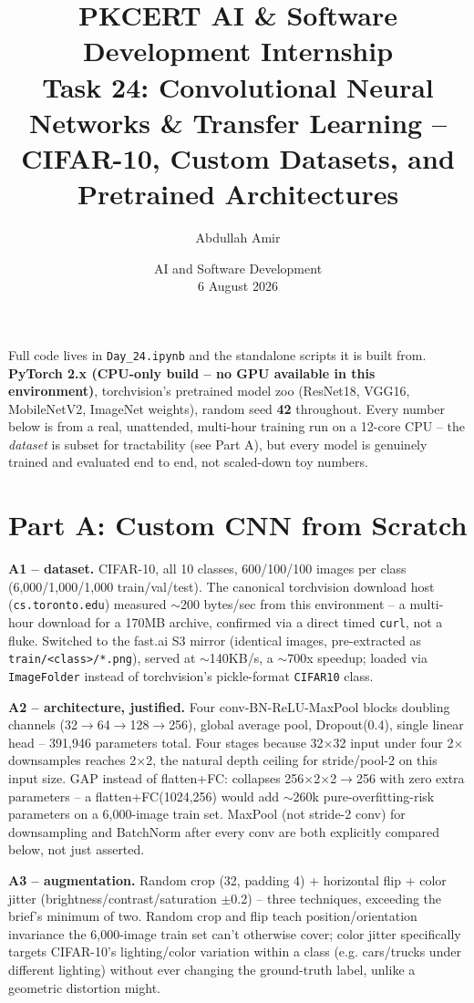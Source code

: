 \documentclass[11pt,a4paper]{article}
\title{\vspace{-1.5cm}\textbf{PKCERT AI \& Software Development Internship \\ Task 24: Convolutional Neural Networks \& Transfer Learning -- CIFAR-10, Custom Datasets, and Pretrained Architectures}}
\author{Abdullah Amir}
\date{AI and Software Development \\ 6 August 2026}
\begin{document}
\maketitle
\vspace{-0.8cm}

Full code lives in \texttt{Day\_24.ipynb} and the standalone scripts it is built from.
\textbf{PyTorch 2.x (CPU-only build -- no GPU available in this environment)},
torchvision's pretrained model zoo (ResNet18, VGG16, MobileNetV2, ImageNet weights), random
seed \textbf{42} throughout. Every number below is from a real, unattended, multi-hour
training run on a 12-core CPU -- the \emph{dataset} is subset for tractability (see Part A),
but every model is genuinely trained and evaluated end to end, not scaled-down toy numbers.

\section*{Part A: Custom CNN from Scratch}

\textbf{A1 -- dataset.} CIFAR-10, all 10 classes, 600/100/100 images per class
(6{,}000/1{,}000/1{,}000 train/val/test). The canonical torchvision download host
(\texttt{cs.toronto.edu}) measured $\sim$200 bytes/sec from this environment -- a multi-hour
download for a 170MB archive, confirmed via a direct timed \texttt{curl}, not a fluke.
Switched to the fast.ai S3 mirror (identical images, pre-extracted as
\texttt{train/<class>/*.png}), served at $\sim$140KB/s, a $\sim$700x speedup; loaded via
\texttt{ImageFolder} instead of torchvision's pickle-format \texttt{CIFAR10} class.

\textbf{A2 -- architecture, justified.} Four conv-BN-ReLU-MaxPool blocks doubling channels
(32$\to$64$\to$128$\to$256), global average pool, Dropout(0.4), single linear head --
391{,}946 parameters total. Four stages because 32$\times$32 input under four 2$\times$
downsamples reaches 2$\times$2, the natural depth ceiling for stride/pool-2 on this input
size. GAP instead of flatten+FC: collapses 256$\times$2$\times$2$\to$256 with zero extra
parameters -- a flatten+FC(1024,256) would add $\sim$260k pure-overfitting-risk parameters
on a 6{,}000-image train set. MaxPool (not stride-2 conv) for downsampling and BatchNorm
after every conv are both explicitly compared below, not just asserted.

\textbf{A3 -- augmentation.} Random crop (32, padding 4) + horizontal flip + color jitter
(brightness/contrast/saturation $\pm$0.2) -- three techniques, exceeding the brief's
minimum of two. Random crop and flip teach position/orientation invariance the 6{,}000-image
train set can't otherwise cover; color jitter specifically targets CIFAR-10's lighting/color
variation within a class (e.g. cars/trucks under different lighting) without ever changing
the ground-truth label, unlike a geometric distortion might.
\end{document}

